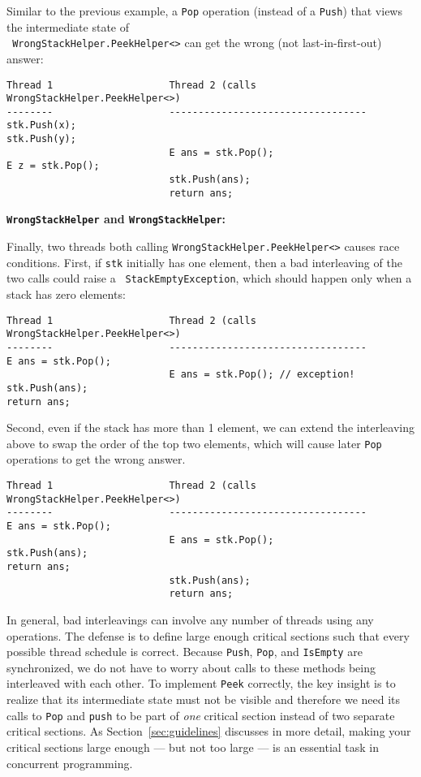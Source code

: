 \documentclass[10pt]{article}
\begin{document}
Similar to the previous example, a {\tt Pop} operation (instead of a
{\tt Push}) that views the intermediate state of\\ {\tt
  WrongStackHelper.PeekHelper<>} can get the wrong (not last-in-first-out) answer:
\begin{verbatim}
Thread 1                    Thread 2 (calls WrongStackHelper.PeekHelper<>)
--------                    ----------------------------------
stk.Push(x);
stk.Push(y);
                            E ans = stk.Pop();
E z = stk.Pop();
                            stk.Push(ans);
                            return ans;
\end{verbatim}

\medskip
\noindent\textbf{{\tt WrongStackHelper} and {\tt WrongStackHelper}:}
\medskip

Finally, two threads both calling {\tt WrongStackHelper.PeekHelper<>} causes race
conditions.  First, if {\tt stk} initially has one element, then
a bad interleaving of the two calls could raise a {\tt
  StackEmptyException}, which should happen only when a stack has zero
elements:
\begin{verbatim}
Thread 1                    Thread 2 (calls WrongStackHelper.PeekHelper<>)
--------                    ----------------------------------
E ans = stk.Pop();
                            E ans = stk.Pop(); // exception!
stk.Push(ans);
return ans;
\end{verbatim}
Second, even if the stack has more than 1 element, we can extend the
interleaving above to swap the order of the top two elements, which
will cause later {\tt Pop} operations to get the wrong answer.
\begin{verbatim}
Thread 1                    Thread 2 (calls WrongStackHelper.PeekHelper<>)
--------                    ----------------------------------
E ans = stk.Pop();
                            E ans = stk.Pop();
stk.Push(ans);
return ans;
                            stk.Push(ans);
                            return ans;
\end{verbatim}

\bigskip

In general, bad interleavings can involve any number of threads using
any operations.  The defense is to define large enough critical
sections such that every possible thread schedule is correct.  Because
{\tt Push}, {\tt Pop}, and {\tt IsEmpty} are synchronized, we do not
have to worry about calls to these methods being interleaved with each
other.  To implement {\tt Peek} correctly, the key insight is to
realize that its intermediate state must not be visible and therefore
we need its calls to {\tt Pop} and {\tt push} to be part of \emph{one}
critical section instead of two separate critical sections.  As
Section~\ref{sec:guidelines} discusses in more detail, making your
critical sections large enough --- but not too large --- is an
essential task in concurrent programming.
\end{document}
